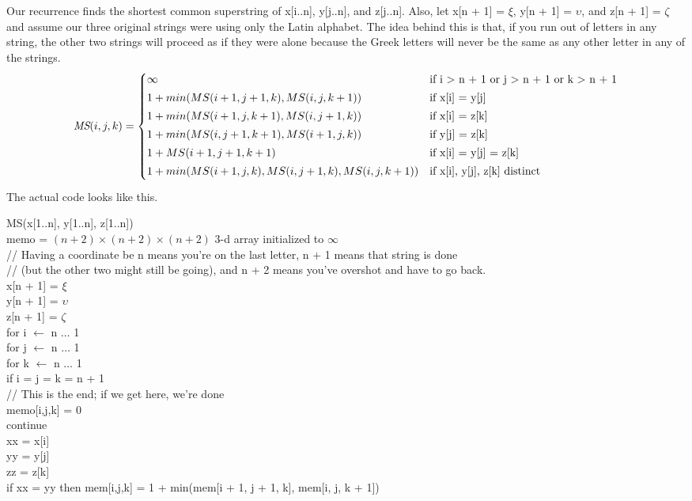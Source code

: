 \documentclass[11pt]{article}
\begin{document}
\begin{solution}
    Our recurrence finds the shortest common superstring of x[i..n], y[j..n], and z[j..n]. Also, let x[n + 1] = $\xi$, y[n + 1] = $\upsilon$, and z[n + 1] = $\zeta$ and assume our three original strings were using only the Latin alphabet. The idea behind this is that, if you run out of letters in any string, the other two strings will proceed as if they were alone because the Greek letters will never be the same as any other letter in any of the strings.
    \[
        \emph{MS}(i, j, k) =
        \begin{cases}
            \infty & \text{if i > n + 1 or j > n + 1 or k > n + 1}
            \\[0.5ex]
            1 + min(MS(i + 1, j + 1, k), MS(i, j, k + 1)) & \text{if x[i] = y[j]}
            \\[0.5ex]
            1 + min(MS(i + 1, j, k + 1), MS(i, j + 1, k)) & \text{if x[i] = z[k]}
            \\[0.5ex]
            1 + min(MS(i, j + 1, k + 1), MS(i + 1, j, k)) & \text{if y[j] = z[k]}
            \\[0.5ex]
            1 + MS(i + 1, j + 1, k + 1) & \text{if x[i] = y[j] = z[k]}
            \\[0.5ex]
            1 + min(MS(i + 1, j, k), MS(i, j + 1, k), MS(i, j, k + 1)) & \text{if x[i], y[j], z[k] distinct}
            \\[0.5ex]
        \end{cases}
    \]
    The actual code looks like this.
    \begin{algo}
        MS(x[1..n], y[1..n], z[1..n]) \+
        \\ memo = $(n + 2) \times (n + 2) \times (n + 2)$ 3-d array initialized to $\infty$
        \\ // Having a coordinate be n means you're on the last letter, n + 1 means that string is done
        \\ // (but the other two might still be going), and n + 2 means you've overshot and have to go back.
        \\ x[n + 1] = $\xi$
        \\ y[n + 1] = $\upsilon$
        \\ z[n + 1] = $\zeta$
        \\ for i $\gets$ n $\ldots$ 1 \+
        \\ for j $\gets$ n $\ldots$ 1 \+
        \\ for k $\gets$ n $\ldots$ 1 \+
        \\ if i = j = k = n + 1 \+
        \\ // This is the end; if we get here, we're done
        \\ memo[i,j,k] = 0
        \\ continue \-
        \\ xx = x[i]
        \\ yy = y[j]
        \\ zz = z[k]
        \\ if xx = yy then mem[i,j,k] = 1 + min(mem[i + 1, j + 1, k], mem[i, j, k + 1])


\end{algo}
\end{solution}
\end{document}
